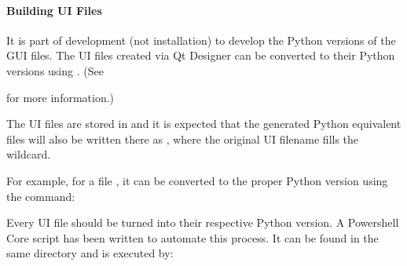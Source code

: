 \documentclass[letterpaper,11pt,english]{sphinxmanual}
\begin{document}
\paragraph{Building UI Files}
\label{\detokenize{technical/architecture/graphical_user_interface:building-ui-files}}\label{\detokenize{technical/architecture/graphical_user_interface:technical-architecture-graphical-user-interface-building-ui-files}}
\sphinxAtStartPar
It is part of development (not installation) to develop the Python versions of
the GUI files. The UI files created via Qt Designer can be converted to their
Python versions using . (See
%
\begin{footnote}[54]\sphinxAtStartFootnote
{}
%
\end{footnote}
for more information.)

\sphinxAtStartPar
The UI files are stored in 
and it is expected that the generated Python equivalent files will also be
written there as , where the original UI filename fills the
wildcard.

\sphinxAtStartPar
For example, for a file , it can be converted to the proper
Python version using the command:

\begin{sphinxVerbatim}[commandchars=\\\{\}]
   
\end{sphinxVerbatim}

\sphinxAtStartPar
Every UI file should be turned into their respective Python version. A
Powershell Core script has been written to automate this process. It can be
found in the same directory and is executed by:

\begin{sphinxVerbatim}[commandchars=\\\{\}]
 
\end{sphinxVerbatim}
\end{document}
